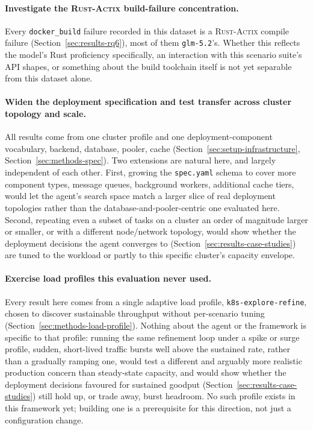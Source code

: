 \paragraph{Investigate the \textsc{Rust-Actix} build-failure concentration.}
Every \texttt{docker\_build} failure recorded in this dataset is a
\textsc{Rust-Actix} compile failure (Section~\ref{sec:results-rq6}), most
of them \texttt{glm-5.2}'s. Whether this reflects the model's Rust
proficiency specifically, an interaction with this scenario suite's API
shapes, or something about the build toolchain itself is not yet
separable from this dataset alone.

\paragraph{Widen the deployment specification and test transfer across
cluster topology and scale.} All results come from one cluster profile
and one deployment-component vocabulary, backend, database, pooler,
cache (Section~\ref{sec:setup-infrastructure},
Section~\ref{sec:methods-spec}). Two extensions are natural here, and
largely independent of each other. First, growing the
\texttt{spec.yaml} schema to cover more component types, message queues,
background workers, additional cache tiers, would let the agent's search
space match a larger slice of real deployment topologies rather than the
database-and-pooler-centric one evaluated here. Second, repeating even a
subset of tasks on a cluster an order of magnitude larger or smaller, or
with a different node/network topology, would show whether the
deployment decisions the agent converges to (Section~\ref{sec:results-case-studies})
are tuned to the workload or partly to this specific cluster's capacity
envelope.

\paragraph{Exercise load profiles this evaluation never used.} Every
result here comes from a single adaptive load profile,
\texttt{k8s-explore-refine}, chosen to discover sustainable throughput
without per-scenario tuning (Section~\ref{sec:methods-load-profile}).
Nothing about the agent or the framework is specific to that profile:
running the same refinement loop under a spike or surge profile, sudden,
short-lived traffic bursts well above the sustained rate, rather than a
gradually ramping one, would test a different and arguably more realistic
production concern than steady-state capacity, and would show whether the
deployment decisions favoured for sustained goodput (Section~\ref{sec:results-case-studies})
still hold up, or trade away, burst headroom. No such profile exists in
this framework yet; building one is a prerequisite for this direction,
not just a configuration change.

